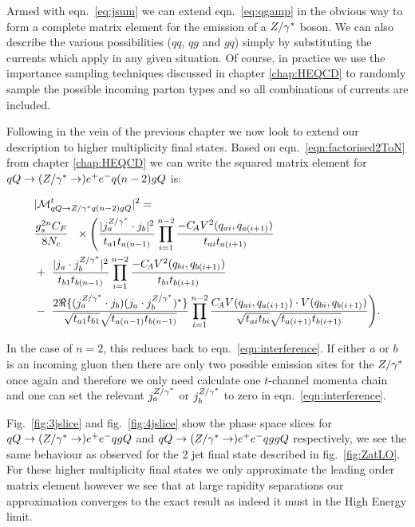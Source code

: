 		Armed with eqn.~\eqref{eq:jsum} we can extend eqn.~\eqref{eq:qgamp} in the obvious way
		to form a complete matrix element for the emission of a $Z/\gamma^*$ boson.  We can also
		describe the various possibilities ($qq$, $qg$ and $gq$) simply by substituting
		the currents which apply in any given situation.  Of course, in practice we use
		the importance sampling techniques discussed in chapter \ref{chap:HEQCD} to
		randomly sample the possible incoming parton types and so all combinations of
		currents are included.

		Following in the vein of the previous chapter we now look to extend our description
		to higher multiplicity final states.  Based on eqn.~\eqref{eqn:factorised2ToN} from
		chapter \ref{chap:HEQCD} we can write the squared matrix element for
		$qQ\to (Z/\gamma^*\to ) e^+e^- q (n-2)g Q$ is:

		\begin{align}
		\begin{split}
		    &|\mathcal{M}^{t}_{qQ\to Z/\gamma^* q(n-2)gQ}|^2 = \\&\frac{g_s^{2n}C_F}{8N_c}\
		    \ \times \Bigg( \frac{| j_a^{Z/\gamma^*}\cdot j_b|^2}{t_{a1}t_{a(n-1)}} \prod^{n-2}_{i=1} \frac{-C_{\!A} V^2(q_{ai},
		      q_{a(i+1)})}{t_{ai} t_{a(i+1)}}  \\ & + \ \frac{|j_a \cdot j_b^{Z/\gamma^*} |^2}{t_{b1}t_{b(n-1)}}
		    \prod^{n-2}_{i=1}\frac{-C_{\!A} V^2(q_{bi}, q_{b(i+1)})}{t_{bi} t_{b(i+1)}}  \\
		    &-\ \frac{2\Re\{(j_a^{Z/\gamma^*}\cdot j_b)({j_a \cdot
		        j_b^{Z/\gamma^*}})^*\}}{\sqrt{t_{a1}t_{b1}}\sqrt{t_{a(n-1)} t_{b(n-1)}}}
		    \prod^{n-2}_{i=1}\frac{C_{\!A} V(q_{ai}, q_{a(i+1)})\cdot V(q_{bi},
		      q_{b(i+1)})}{\sqrt{t_{ai}t_{bi}} \sqrt{t_{a(i+1)}t_{b(i+1)}}}\Bigg).
			\label{eq:allorderreal}
		\end{split}
		\end{align}

		In the case of $n=2$, this reduces back to eqn.~\eqref{eqn:interference}.  If
		either $a$ or $b$ is an incoming gluon then there are only two possible emission sites
		for the $Z/\gamma^*$ once again and therefore we only need calculate one $t$-channel momenta chain
		and one can set the relevant $j_a^{Z/\gamma^*}$ or $j_b^{Z/\gamma^*}$ to
		zero in eqn.~\eqref{eqn:interference}.

		Fig.~\eqref{fig:3jslice} and fig.~\eqref{fig:4jslice} show the phase space
		slices for $qQ\to(Z/\gamma^*\to)e^+e^-qgQ$ and $qQ\to(Z/\gamma^*\to)e^+e^-qggQ$
		respectively, we see the same behaviour as observed for the 2 jet final state described in
		fig.~\eqref{fig:ZatLO}.  For these higher multiplicity final states we only
		approximate the leading order matrix element however we see that at large rapidity separations
		our approximation converges to the exact result as indeed it must in the High Energy limit.

